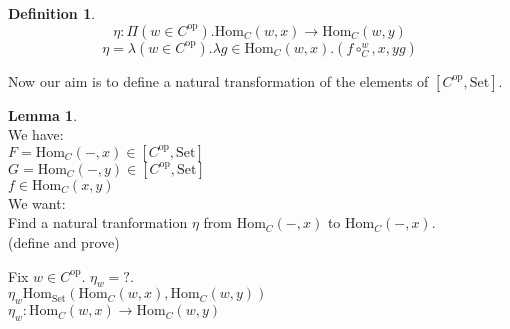 \documentclass[10pt,a4paper]{article}
\theoremstyle{definition}
\newtheorem{definition}{Definition}[section]
\newtheorem{lemma}{Lemma}[section]
\newcommand{\Hom}{{\mbox{Hom}}}
\newcommand{\op}{{\mbox{op}}}
\newcommand{\Set}{{\mbox{Set}}}
\begin{document}
\begin{definition}
$$\eta : \Pi(w\in C^\op).\Hom_C(w,x)\to \Hom_C(w,y)$$
$$\eta = \lambda (w\in C^\op). \lambda g\in\Hom_C(w,x).(f\circ_C^w,x,y g)$$
\end{definition}
Now our aim is to define a natural transformation of the elements of $[C^\op,\Set]$.\\
\begin{lemma}$\mbox{ }$\\
We have:\\
$F=\Hom_C(-,x)\in [C^\op,\Set]$\\
$G=\Hom_C(-,y)\in [C^\op,\Set]$\\
$f\in\Hom_C(x,y)$\\
We want:\\
Find a natural tranformation $\eta$ from $\Hom_C(-,x)$ to $\Hom_C(-,x)$.\\ (define and prove)\\
\end{lemma}
Fix $w\in C^\op$. $\eta_w = ?$.\\
$\eta_w\Hom_\Set(\Hom_C(w,x),\Hom_C(w,y))$\\
$\eta_w: \Hom_C(w,x)\to \Hom_C(w,y)$\\
\end{document}
